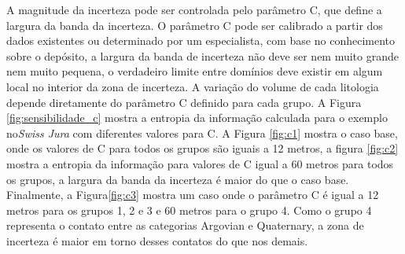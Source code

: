 A magnitude da incerteza pode ser controlada pelo parâmetro C, que define a largura da banda da incerteza. O parâmetro C pode ser calibrado a partir dos dados existentes ou determinado por um especialista, com base no conhecimento sobre o depósito, a largura da banda de incerteza não deve ser nem muito grande nem muito pequena, o verdadeiro limite entre domínios deve existir em algum local no interior da zona de incerteza. A variação do volume de cada litologia depende diretamente do parâmetro C definido para cada grupo. A Figura \autoref{fig:sensibilidade_c} mostra a entropia da informação calculada para o exemplo no\textit{Swiss Jura} com diferentes valores para C. A Figura \autoref{fig:c1} mostra o caso base, onde os valores de C para todos os grupos são iguais a 12 metros, a figura \autoref{fig:c2} mostra a entropia da informação para valores de C igual a 60 metros para todos os grupos, a largura da banda da incerteza é maior do que o caso base. Finalmente, a Figura\autoref{fig:c3} mostra um caso onde o parâmetro C é igual a 12 metros para os grupos 1, 2 e 3 e 60 metros para o grupo 4. Como o grupo 4 representa o contato entre as categorias Argovian e Quaternary, a zona de incerteza é maior em torno desses contatos do que nos demais.

